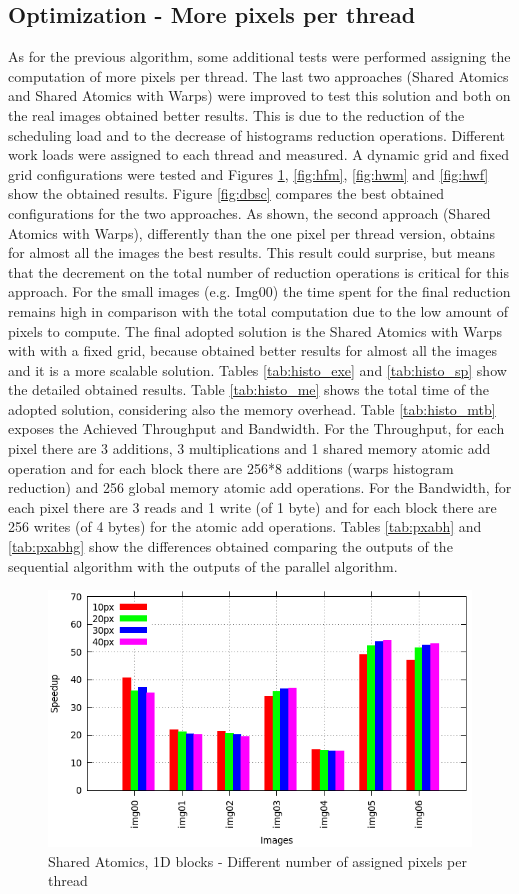 \documentclass[a4paper]{article}
\begin{document}
\subsection{Optimization - More pixels per thread}
\label{sec:hop}
As for the previous algorithm, some additional tests were performed assigning the computation of more pixels per thread. The last two approaches (Shared Atomics and Shared Atomics with Warps) were improved to test this solution and both on the real images obtained better results. This is due to the reduction of the scheduling load and to the decrease of histograms reduction operations. Different work loads were assigned to each thread and measured. A dynamic grid and fixed grid configurations were tested and Figures \ref{fig:hum}, \ref{fig:hfm}, \ref{fig:hwm} and \ref{fig:hwf} show the obtained results. Figure \ref{fig:dbsc} compares the best obtained configurations for the two approaches. As shown, the second approach (Shared Atomics with Warps), differently than the one pixel per thread version, obtains for almost all the images the best results. This result could surprise, but means that the decrement on the total number of reduction operations is critical for this approach. For the small images (e.g. Img00) the time spent for the final reduction remains high in comparison with the total computation due to the low amount of pixels to compute. The final adopted solution is the Shared Atomics with Warps with with a fixed grid, because obtained better results for almost all the images and it is a more scalable solution. Tables \ref{tab:histo_exe} and \ref{tab:histo_sp} show the detailed obtained results. Table \ref{tab:histo_me} shows the total time of the adopted solution, considering also the memory overhead. Table \ref{tab:histo_mtb} exposes the Achieved Throughput and Bandwidth. For the Throughput, for each pixel there are 3 additions, 3 multiplications and 1 shared memory atomic add operation and for each block there are 256*8 additions (warps histogram reduction) and 256 global memory atomic add operations. For the Bandwidth, for each pixel there are 3 reads and 1 write (of 1 byte) and for each block there are 256 writes (of 4 bytes) for the atomic add operations.
Tables \ref{tab:pxabh} and \ref{tab:pxabhg} show the differences obtained comparing the outputs of the sequential algorithm with the outputs of the parallel algorithm.


\begin{figure}[!ht]
    \centering
    \includegraphics[width=0.65\linewidth]{res/new/histogram_uni_more}
    \caption{Shared Atomics, 1D blocks - Different number of assigned pixels per thread}
    \label{fig:hum}
\end{figure}
\FloatBarrier
\end{document}

